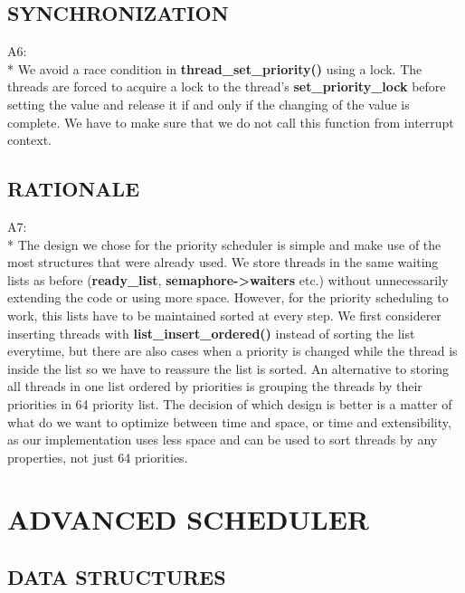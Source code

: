 \documentclass{article}
\begin{document}
\subsection*{SYNCHRONIZATION }
\justify

A6:\\*
We avoid a race condition in \textbf{thread\_set\_priority()} using a lock. The threads are forced to acquire a lock to the thread's \textbf{set\_priority\_lock} before setting the value and release it if and only if the changing of the value is complete. We have to make sure that we do not call this function from interrupt context.

\subsection*{RATIONALE}
\justify

A7:\\*
The design we chose for the priority scheduler is simple and make use of the
most structures that were already used. We store threads in the same waiting lists
as before (\textbf{ready\_list}, \textbf{semaphore-\textgreater waiters} etc.) without unnecessarily extending the
code or using more space. However, for the priority scheduling to work, this lists
have to be maintained sorted at every step.
    We first considerer inserting threads with \textbf{list\_insert\_ordered()} instead of
sorting the list everytime, but there are also cases when a priority is changed
while the thread is inside the list so we have to reassure the list is sorted.
    An alternative to storing all threads in one list ordered by priorities is
grouping the threads by their priorities in 64 priority list. The decision of which
design is better is a matter of what do we want to optimize between time and space,
or time and extensibility, as our implementation uses less space and can be used
to sort threads by any properties, not just 64 priorities.


\section*{ADVANCED SCHEDULER}

\subsection*{DATA STRUCTURES}
\justify
\end{document}
